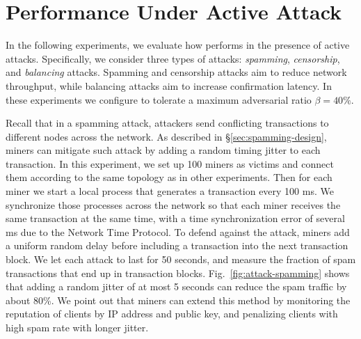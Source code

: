 \section{Performance Under Active Attack}
\label{sec:eval-attack}

In the following experiments, we evaluate how \prism performs in the presence of active attacks. Specifically, we consider three  types of attacks: {\em spamming}, \textit{censorship}, and \textit{balancing} attacks. Spamming and censorship attacks aim to reduce network throughput, while balancing attacks aim to increase confirmation latency. 
In these experiments we configure \prism to tolerate a maximum adversarial ratio $\beta=40\%$. 




\label{sec:spamming-eval}
 Recall that in a spamming attack, attackers send conflicting transactions to different nodes across the network. As described in \S\ref{sec:spamming-design}, miners can mitigate such attack by adding a random timing jitter to each transaction. In this experiment, we set up 100 miners as victims and connect them according to the same topology as in other experiments. Then for each miner we start a local process that generates a transaction every 100 ms. We synchronize those processes across the network so that each miner receives the same transaction at the same time, with a time synchronization error of several ms due to the Network Time Protocol. 
To defend against the attack, miners add a uniform random delay before including a transaction into the next transaction block. We let each attack to last for 50 seconds, and measure the fraction of spam transactions that end up in transaction blocks. 
Fig.~\ref{fig:attack-spamming} shows that adding a random jitter of at most 5 seconds can reduce the spam traffic by about 80\%. 
We point out that miners can extend this method by monitoring the reputation of clients by IP address and public key, and penalizing clients with high spam rate with longer jitter.


